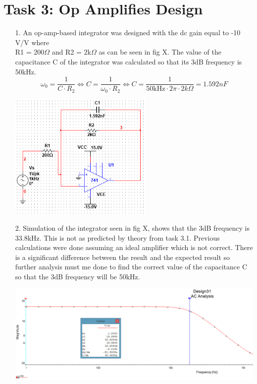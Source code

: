 \documentclass[11pt,a4paper]{article}
\begin{document}
\section*{Task 3: Op Amplifies Design}

\begin{enumerate}
  \item[1.]
  An op-amp-based integrator was designed with the dc gain equal to -10 V/V where \\R1 = 200$\Omega$ and R2 = 2k$\Omega$ as can be seen in fig X. The value of the capacitance C of the integrator was calculated so that its 3dB frequency is 50kHz. %
$$\omega_0 = \frac{1}{C\cdot R_2} \Leftrightarrow C = \frac{1}{\omega_0 \cdot R_2} \Leftrightarrow C  = \frac{1}{50\text{kHz}\cdot 2\pi \cdot 2k\Omega} = 1.592 nF $$
  \begin{minipage}{\linewidth}
    	\centering       
        \includegraphics[width=7cm]{Task3_1.png}
    \end{minipage}
  \item[2.]
  Simulation of the integrator seen in fig X, shows that the 3dB frequency is 33.8kHz. This is not as predicted by theory from task 3.1. Previous calculations were done assuming an ideal amplifier which is not correct. There is a significant difference between the result and the expected result so further analysis must me done to find the correct value of the capacitance C so that the 3dB frequency will be 50kHz.\\
  \begin{minipage}{\linewidth}
    	\centering       
        \includegraphics[width=14cm]{Task3_2.png}

\end{minipage}
\end{enumerate}
\end{document}
